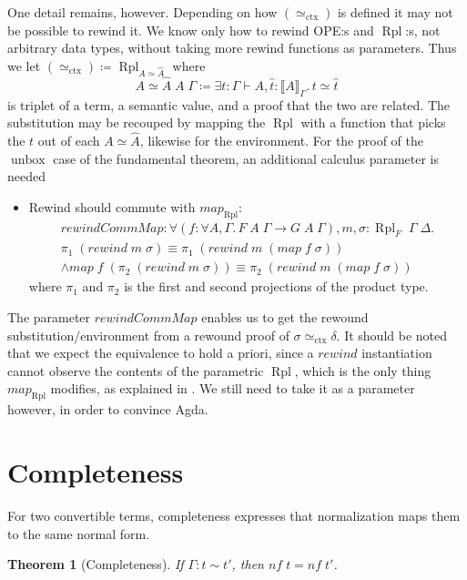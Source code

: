 \documentclass[12pt,twoside,openright]{report}
\numberwithin{equation}{chapter}
\numberwithin{figure}{chapter}
\numberwithin{table}{chapter}
\newtheorem{theorem}{Theorem}
\theoremstyle{definition}\newtheorem{definition}{Definition}
\begin{document}
One detail remains, however.
Depending on how $(\simeq_\text{ctx})$ is defined it may not be possible to rewind it.
We know only how to rewind OPE:s and $\operatorname{Rpl}$:s,
not arbitrary data types, without taking more rewind functions as parameters.
Thus we let $(\simeq_\text{ctx}) \coloneqq \operatorname{Rpl}_{A\simeq\widehat A}$ where
$$ A\!\simeq\!\widehat A \; A \; \Gamma \coloneqq \exists t : \Gamma \vdash A, \hat t : \llbracket A \rrbracket_\Gamma.\, t \simeq \hat t $$
is triplet of a term, a semantic value, and a proof that the two are related.
The substitution may be recouped by mapping the $\operatorname{Rpl}$
with a function that picks the $t$ out of each $A\!\simeq\!\widehat A$,
likewise for the environment.
For the proof of the $\operatorname{unbox}$ case of the fundamental theorem,
an additional calculus parameter is needed
\begin{itemize}
\item Rewind should commute with $\textit{map}_{\operatorname{Rpl}}$:
  \begin{multline*}
  \textit{rewindCommMap} : \forall (f : \forall A, \Gamma.\, F \; A \; \Gamma \to G \; A \; \Gamma), m, \sigma : \operatorname{Rpl}_F \; \Gamma \; \Delta. \\
  \pi_1 \; (\textit{rewind} \; m \; \sigma) \equiv \pi_1 \; (\textit{rewind} \; m \; (\textit{map} \; f \; \sigma)) \\
  \land \textit{map} \; f \; (\pi_2 \; (\textit{rewind} \; m \; \sigma)) \equiv \pi_2 \; (\textit{rewind} \; m \; (\textit{map} \; f \; \sigma))
  \end{multline*}
  where $\pi_1$ and $\pi_2$ is the first and second projections of the product type.
\end{itemize}
The parameter $\textit{rewindCommMap}$ enables us
to get the rewound substitution/environment
from a rewound proof of $\sigma \simeq_\text{ctx} \delta$.
It should be noted that we expect the equivalence to hold a priori,
since a $\textit{rewind}$ instantiation cannot observe
the contents of the parametric $\operatorname{Rpl}$,
which is the only thing $\textit{map}_{\operatorname{Rpl}}$ modifies,
as explained in  \cite{wadler89}.
We still need to take it as a parameter however,
in order to convince Agda.

\section{Completeness}

For two convertible terms,
completeness expresses that normalization maps them to the same normal form.
\begin{theorem}[Completeness]
  If $\Gamma : t \sim t'$, then $\textit{nf} \; t = \textit{nf} \; t'$.
\end{theorem}
\end{document}
